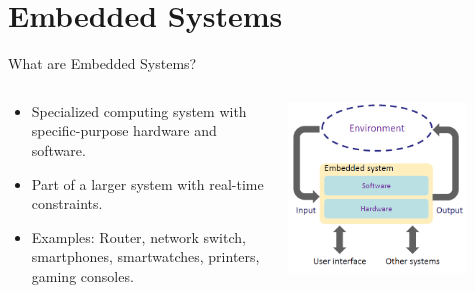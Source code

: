 \section{Embedded Systems}
\begin{frame}{What are Embedded Systems?}
  \begin{columns}
      \begin{column}{0.5\textwidth}   
          \begin{itemize}
            \item Specialized computing system with specific-purpose hardware and software.
            \item Part of a larger system with real-time constraints.
            \item Examples: Router, network switch, smartphones, smartwatches, printers, gaming consoles.
          \end{itemize}
      \end{column}
  \begin{column}{0.5\textwidth} 
  \begin{center}
    \includegraphics[width=0.8\textwidth]{trainingmaterials/rpibasics/embeddedsystem.png} 
  \end{center}
  \end{column}
 \end{columns}
\end{frame}


